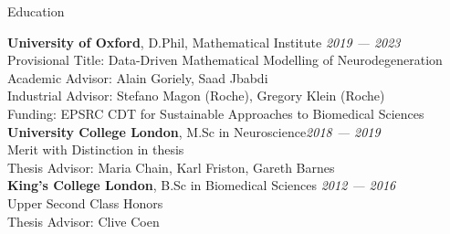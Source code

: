 \begin{rSection}{Education}

{\bf University of Oxford}, D.Phil, Mathematical Institute  \hfill {\em 2019 — 2023} \\
Provisional Title: Data-Driven Mathematical Modelling of Neurodegeneration \\
Academic Advisor: Alain Goriely, Saad Jbabdi \\
Industrial Advisor: Stefano Magon (Roche), Gregory Klein (Roche)\\
Funding: EPSRC CDT for Sustainable Approaches to Biomedical Sciences \\

{\bf University College London},  M.Sc in Neuroscience\hfill {\em 2018 — 2019} \\ 
Merit with Distinction in thesis \\
Thesis Advisor: Maria Chain, Karl Friston, Gareth Barnes \\

{\bf King's College London}, B.Sc in Biomedical Sciences \hfill {\em 2012 — 2016} \\ 
Upper Second Class Honors \\
Thesis Advisor: Clive Coen

\end{rSection}

